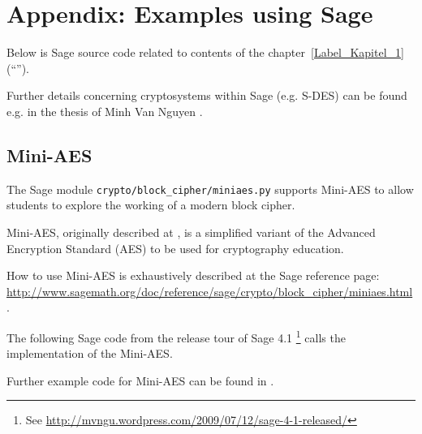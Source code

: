 	

\newpage
\hypertarget{CM_Appendix_SageCode}{}
\section{Appendix: Examples using Sage}
\label{CM_Sage_samples}

\noindent Below is Sage source code related to contents of the
chapter~\ref{Label_Kapitel_1} (``''). 

Further details concerning cryptosystems within Sage (e.g. S-DES) can be
found e.g. in the thesis of Minh Van Nguyen \cite{cm:Nguyen2009}.

\subsection{Mini-AES}
\label{CM_Sage_Mini-AES}

The Sage module \texttt{crypto/block\_cipher/miniaes.py} supports Mini-AES to allow
students to explore the working of a modern block cipher.

Mini-AES, originally described at \cite{cm:Phan2002}, is a simplified variant of the Advanced
Encryption Standard (AES) to be used for cryptography education.

How to use Mini-AES is exhaustively described at the Sage reference page:\\
\url{http://www.sagemath.org/doc/reference/sage/crypto/block_cipher/miniaes.html}.

The following Sage code from the release tour of Sage 4.1%
\footnote{
See \url{http://mvngu.wordpress.com/2009/07/12/sage-4-1-released/}
}
calls the implementation of the Mini-AES.

Further example code for Mini-AES can be found in \cite[chap. 6.5 and appendix D]{cm:Nguyen2009}.

